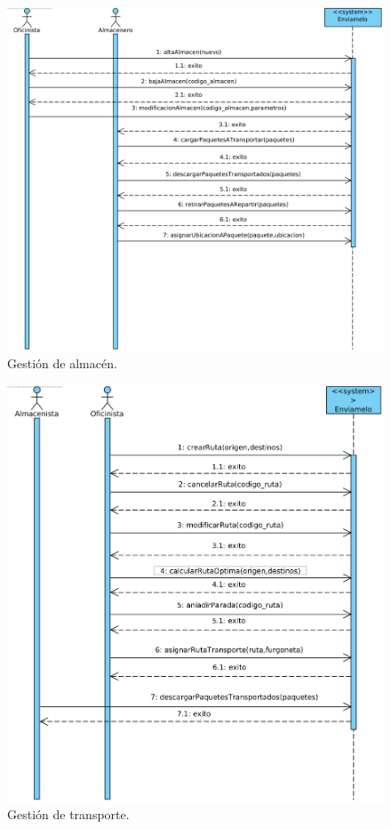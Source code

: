 \documentclass[12pt,spanish]{article}
\begin{document}
\begin{figure}[H]
\centering
\includegraphics[scale=0.8]{gestion_almacen.png}
\caption{Gestión de almacén.}
\end{figure}

\begin{figure}[H]
\centering
\includegraphics[scale=1]{gestion_transporte.png}
\caption{Gestión de transporte.}
\end{figure}
\end{document}
